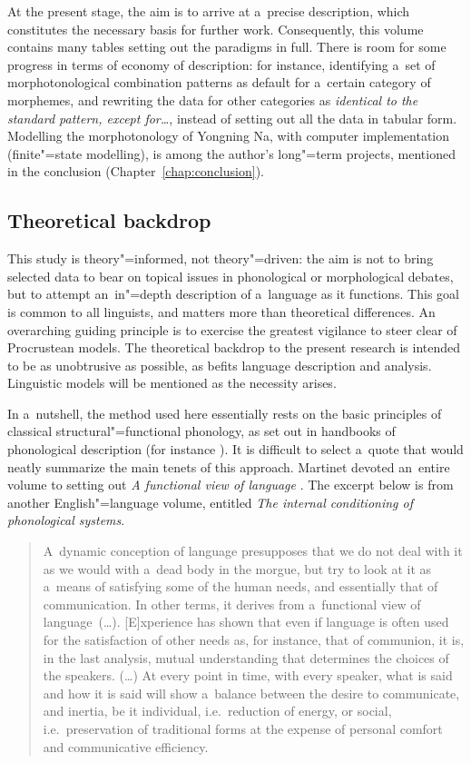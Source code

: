 At the present stage, the aim is to arrive at a~precise description, which constitutes the necessary basis for further work. Consequently, this volume contains many tables setting out the paradigms in full. There is room for some progress in terms of economy of description: for instance, identifying a~set of morphotonological combination patterns as default for a~certain category of morphemes, and rewriting the data for other categories as \textit{identical to the standard pattern, except for{\dots}}, instead of setting out all the data in tabular form. Modelling the morphotonology of Yongning Na, with computer implementation (finite"=state modelling), is among the author's long"=term projects, mentioned in the conclusion (Chapter~\ref{chap:conclusion}).


\subsection{Theoretical backdrop}
\label{sec:theoreticalbackdrop}

This study is theory"=informed, not theory"=driven: the aim is not to bring selected data to bear on topical issues in phonological or morphological debates, but to attempt an~in"=depth description of a~language as it functions. This goal is common
to all linguists, and matters more than theoretical differences. An overarching guiding principle is to exercise the greatest vigilance to steer clear of Procrustean models. The theoretical backdrop to the present research is intended to be as unobtrusive as possible, as befits language description and analysis. Linguistic models will be mentioned as the necessity arises. 

In a~nutshell, the method used here essentially rests on the basic principles of classical structural"=functional phonology, as
set out in handbooks of phonological description (for instance \citealt[15,
  34--47]{martinet1956}). It is difficult to select a~quote that would neatly summarize
the main tenets of this approach. Martinet devoted an~entire volume to setting out \textit{A
  functional view of language} \citep{martinet1962}. The excerpt below is from another
{English}"=language volume, entitled \textit{The internal conditioning of phonological systems}.

\begin{quotation}
  A~dynamic conception of language presupposes that we do not deal with it as we would with a~dead
  body in the morgue, but try to look at it as a~means of satisfying some of the human needs, and
  essentially that of communication. In other terms, it derives from a~functional view of language~({\dots}). 
  [E]xperience has shown that even if language is often used for the satisfaction of
  other needs as, for instance, that of communion, it is, in the last analysis, mutual understanding
  that determines the choices of the speakers. ({\dots}) At every point in time, with every speaker,
  what is said and how it is said will show a~balance between the desire to communicate, and
  inertia, be it individual, i.e.\ reduction of energy, or social, i.e.\ preservation of traditional
  forms at the expense of personal comfort and communicative efficiency.~\citep[2–3]{martinet1996}
\end{quotation}

